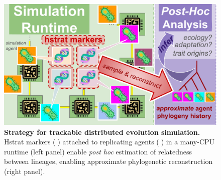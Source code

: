 \begin{figure}
  \vspace{2ex}
    \centering
  \includegraphics[width=0.8\linewidth]{img/runtime-posthoc-schematic}
  \vspace{-1.5ex}
    \caption{\textbf{Strategy for trackable distributed evolution simulation.}
    \footnotesize %
    Hstrat markers (🧬) attached to replicating agents (🦠) in a many-CPU runtime (left panel) enable \textit{post hoc} estimation of relatedness between lineages, enabling approximate phylogenetic reconstruction (right panel).
    }
    \label{fig:runtime-posthoc-schematic}
\vspace{-0.2in}
\end{figure}
